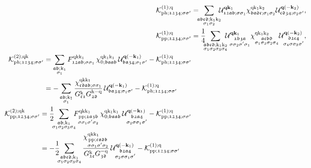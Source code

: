 \documentclass[../../main.tex]{subfiles}
\begin{document}
\begin{align}
 	\mathcal{K}^{(1);\q}_{\ph;\mathfrak{1234};\ss'}&=\!\!\!\sum_{\substack{\mathfrak{abcd};\k_1\k_2\\\sigma_1\sigma_2}} \!\!\!\mathcal{U}^{\vv{q}\vv{k}_1}_{\mathfrak{12ab};\ss_1}\chi^{\q\k_1\k_2}_{\mathfrak{badc};\sigma_1\sigma_2}\mathcal{U}^{\vv{q}(-\vv{k}_2)}_{\mathfrak{cd34};\sigma_2\sigma'},\label{eq:kernel_1}\\
 	\mathcal{K}^{(1);\q}_{\pp;\mathfrak{1234};\ss'}&=\frac14\!\!\!\sum_{\substack{\mathfrak{abcd};\k_1\k_2\\\sigma_1\sigma_2\sigma_3\sigma_4}} \!\!\!\mathcal{U}^{\vv{q}\vv{k}_1}_{\substack{\mathfrak{1b3a}\\\ss_2\sigma'\sigma_1}}\chi^{\q\k_1\k_2}_{\substack{\mathfrak{acbd}\\\sigma_1\sigma_3\sigma_2\sigma_4}}\mathcal{U}^{\vv{q}(-\vv{k}_2)}_{\substack{\mathfrak{d2c4}\\\sigma_4\sigma\sigma_3\sigma'}},\label{eq:kernel_1_pp}\\
\begin{split}\label{eq:kernel_2}
	\mathcal{K}^{(2);\q\k}_{\ph;\mathfrak{1234};\ss'}&=\sum_{\substack{\mathfrak{ab};\k_1\\\sigma_1}} F^{\q\k\k_1}_{\mathfrak{12ab};\ss_1}\,\chi^{\q\k_1\k_1}_{0;\mathfrak{baab}}\,\mathcal{U}^{\vv{q}(-\vv{k}_1)}_{\mathfrak{ba34};\sigma_1\sigma'}-\mathcal{K}^{(1);\q}_{\ph;\mathfrak{1234};\ss'}\\
	&=-\sum_{\substack{\mathfrak{ab};\k_1\\\sigma_1}} \frac{\chi^{\q\k\k_1}_{\mathfrak{cdab};\ss_1}}{G^{\k}_{\mathfrak{c1}}G^{\k-\q}_{\mathfrak{2d}}}\,\mathcal{U}^{\vv{q}(-\vv{k}_1)}_{\mathfrak{ba34};\sigma_1\sigma'}-\mathcal{K}^{(1);\q}_{\ph;\mathfrak{1234};\ss'}
\end{split}\\
\begin{split}\label{eq:kernel_2_pp}
	\mathcal{K}^{(2);\q\k}_{\pp;\mathfrak{1234};\ss'}&=\frac12\!\!\!\sum_{\substack{\mathfrak{ab};\k_1\\\sigma_1\sigma_2\sigma_3\sigma_4}} \!\!\!F^{\q\k\k_1}_{\substack{\pp;\mathfrak{1a3b}\\\sigma\sigma_1\sigma'\sigma_2}}\,\chi^{\q\k_1\k_1}_{0;\mathfrak{baab}}\,\mathcal{U}^{\vv{q}(-\vv{k}_1)}_{\substack{\mathfrak{b2a4}\\\sigma_2\sigma\sigma_1\sigma'}}-\mathcal{K}^{(1);\q}_{\pp;\mathfrak{1234};\ss'}\\
	&=-\frac12\!\!\!\sum_{\substack{\mathfrak{abcd};\k_1\\\sigma_1\sigma_2\sigma_3\sigma_4}} \frac{\chi^{\q\k\k_1}_{\substack{\pp;\mathfrak{cadb}\\\sigma\sigma_1\sigma'\sigma_2}}}{G^{\k}_{\mathfrak{1c}}G^{-\q}_{\mathfrak{3d}}}\,\mathcal{U}^{\vv{q}(-\vv{k}_1)}_{\substack{\mathfrak{b2a4}\\\sigma_2\sigma\sigma_1\sigma'}}-\mathcal{K}^{(1);\q}_{\pp;\mathfrak{1234};\ss'}
\end{split}
\end{align}
\end{document}

